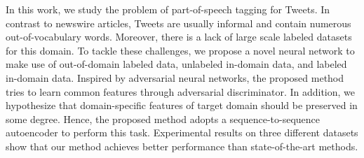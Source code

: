In this work, we study the problem of part-of-speech tagging for Tweets. In contrast to newswire articles, Tweets are usually informal and contain numerous out-of-vocabulary words. Moreover, there is a lack of large scale labeled datasets for this domain. To tackle these challenges, we propose a novel neural network to make use of out-of-domain labeled data, unlabeled in-domain data, and labeled in-domain data.  Inspired by adversarial neural networks, the proposed method tries to learn common features through adversarial discriminator. In addition, we hypothesize that domain-specific features of target domain should be preserved in some degree. Hence, the proposed method adopts a sequence-to-sequence autoencoder to perform this task.  Experimental results on three different datasets  show that our method achieves better performance than state-of-the-art methods.
